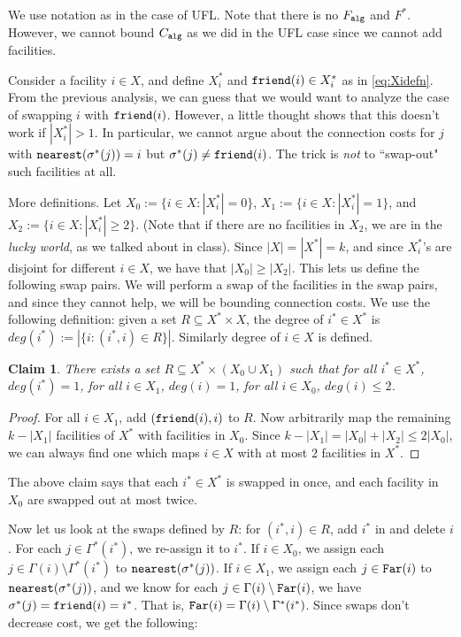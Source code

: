 \documentclass[11pt]{article}
\newtheorem{claim}{Claim}
\def\alg{{\tt alg}}
\begin{document}
\def\i{i^*}
\noindent
We use notation as in the case of UFL. Note that there is no $F_{\alg}$ and $F^*$. However, we cannot
bound $C_{\alg}$ as we did in the UFL case since we cannot add facilities.

Consider a facility $i\in X$, and define $X^*_i$ and ${\tt friend}(i)\in X^*_i$ as in \eqref{eq:Xidefn}. 
From the previous analysis, we can guess that we would want to analyze the case of 
swapping $i$ with ${\tt friend}(i)$. However, a little thought shows that this doesn't work if 
$|X^*_i| > 1$. In particular, we cannot argue about the connection costs for $j$ with
${\tt nearest}(\sigma^*(j)) = i$ but $\sigma^*(j)\neq {\tt friend}(i)$. The trick is {\em not} to ``swap-out"
such facilities at all.

More definitions. Let $X_0 := \{i\in X: |X^*_i| = 0\}$, 
$X_1 := \{i\in X: |X^*_i| = 1\}$, and $X_{2} := \{i\in X: |X^*_i| \ge 2\}$. 
(Note that if there are no facilities in $X_2$, we are in the {\em lucky world}, as we
talked about in class).
Since $|X| = |X^*| =k$, and since $X^*_i$'s are disjoint for different $i\in X$, 
we have that $|X_0| \ge |X_2|$. This lets us define the following swap pairs.
We will perform a swap of the facilities in the swap pairs, and since they cannot help,
we will be bounding connection costs.
We use the following definition: given a set $R\subseteq X^*\times X$, the degree
of $\i\in X^*$ is $deg(\i) := |\{i:(\i,i)\in R\}|$. Similarly degree of $i\in X$ is defined.

\begin{claim}\label{claim:mapping}
There exists a set $R \subseteq X^* \times (X_0\cup X_1)$ such that
for all $\i\in X^*$, $deg(\i)=1$,
for all $i\in X_1$, $deg(i) = 1$, for all $i\in X_0$, $deg(i)\le 2$.
\end{claim}
\begin{proof}
For all $i\in X_1$, add $({\tt friend}(i),i)$ to $R$. Now arbitrarily map the remaining $k - |X_1|$ facilities
of $X^*$ with facilities in $X_0$. Since $k - |X_1| = |X_0| +|X_2| \le 2|X_0|$, we can always 
find one which maps $i\in X$ with at most $2$ facilities in $X^*$.
\end{proof}
The above claim says that each $i^*\in X^*$ is swapped in once, and each facility in $X_0$ are swapped
out at most twice. 

Now let us look at the swaps defined by $R$: for $(i^*,i)\in R$, add $i^*$ in and delete $i$.
For each $j\in \Gamma^*(i^*)$, we re-assign it to $i^*$. If $i\in X_0$, we assign each $j\in \Gamma(i)\setminus \Gamma^*(\i)$ to ${\tt nearest}(\sigma^*(j))$. If $i\in X_1$, we assign each $j\in {\tt Far}(i)$ to 
 ${\tt nearest}(\sigma^*(j))$, and we know for each $j\in \Gamma(i)\setminus{\tt Far}(i)$, we have $\sigma^*(j) = {\tt friend}(i) = i^*$. That is, $\Far(i) = \Gamma(i)\setminus\Gamma^*(\i)$. Since swaps don't decrease cost, we get the following: \\
\end{document}

